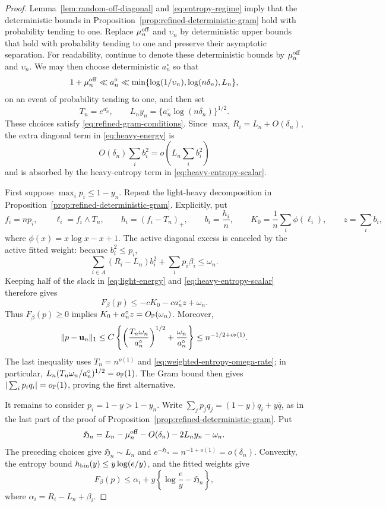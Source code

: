 \begin{proof}
Lemma~\ref{lem:random-off-diagonal} and \eqref{eq:entropy-regime} imply that
the deterministic bounds in Proposition~\ref{prop:refined-deterministic-gram}
hold with probability tending to one. Replace
\(\mu_n^{\rm off}\) and \(\upsilon_n\) by deterministic upper bounds that
hold with probability tending to one and preserve their asymptotic
separation. For readability, continue to denote these deterministic bounds by
\(\mu_n^{\rm off}\) and \(\upsilon_n\). We may then choose
deterministic \(a_n^\circ\) so that
\[
 1+\mu_n^{\rm off}\ll a_n^\circ\ll
 \min\{\log(1/\upsilon_n),\log(n\delta_n),L_n\},
\]
on an event of probability tending to one, and then set
\[
 T_n=e^{a_n^\circ},
 \qquad
 L_ny_n=\{a_n^\circ\log(n\delta_n)\}^{1/2}.
\]
These choices satisfy \eqref{eq:refined-gram-conditions}. Since
\(\max_iR_i=L_n+O(\delta_n)\), the extra diagonal term in
\eqref{eq:heavy-energy} is
\[
 O(\delta_n)\sum_i b_i^2
 =o\left(L_n\sum_i b_i^2\right)
\]
and is absorbed by the heavy-entropy term in
\eqref{eq:heavy-entropy-scalar}.

First suppose \(\max_i p_i\le1-y_n\).  Repeat the light-heavy
decomposition in Proposition~\ref{prop:refined-deterministic-gram}. Explicitly,
put
\[
 f_i=np_i,\qquad \ell_i=f_i\wedge T_n,\qquad h_i=(f_i-T_n)_+,
 \qquad b_i=\frac{h_i}{n},
 \qquad K_0=\frac1n\sum_i\phi(\ell_i),\qquad
 z=\sum_i b_i,
\]
where \(\phi(x)=x\log x-x+1\).
The active diagonal excess is canceled by the active fitted weight:
because \(b_i^2\le p_i\),
\[
 \sum_{i\in A}(R_i-L_n)b_i^2+\sum_i p_i\beta_i
 \le\omega_n.
\]
Keeping half of the slack in \eqref{eq:light-energy} and
\eqref{eq:heavy-entropy-scalar} therefore gives
\begin{equation}
\label{eq:weighted-diffuse-slack}
 F_\beta(p)
 \le
 -cK_0-ca_n^\circ z+\omega_n.
\end{equation}
Thus \(F_\beta(p)\ge0\) implies
\(K_0+a_n^\circ z=O_{\mathbb P}(\omega_n)\).  Moreover,
\[
 \|p-\mathbf u_n\|_1
 \le
 C\left\{
   \left(\frac{T_n\omega_n}{a_n^\circ}\right)^{1/2}
   +\frac{\omega_n}{a_n^\circ}
 \right\}
 \le n^{-1/2+o_{\mathbb P}(1)}.
\]
The last inequality uses \(T_n=n^{o(1)}\) and
\eqref{eq:weighted-entropy-omega-rate}; in particular,
\(L_n(T_n\omega_n/a_n^\circ)^{1/2}=o_{\mathbb P}(1)\).
The Gram bound then gives
\(|\sum_i p_iq_i|=o_{\mathbb P}(1)\), proving the first alternative.

It remains to consider \(p_i=1-y>1-y_n\).  Write
\(\sum_jp_jq_j=(1-y)q_i+y\bar q\), as in the last part of the proof of
Proposition~\ref{prop:refined-deterministic-gram}.  Put
\[
 \mathfrak H_n
 =
 L_n-\mu_n^{\rm off}-O(\delta_n)-2L_ny_n-\omega_n.
\]
The preceding choices give
\(\mathfrak H_n\sim L_n\) and
\(e^{-\mathfrak H_n}=n^{-1+o(1)}=o(\delta_n)\). Convexity,
the entropy bound \(h_{\rm bin}(y)\le y\log(e/y)\), and the fitted weights give
\begin{equation}
\label{eq:weighted-near-vertex}
 F_\beta(p)
 \le
 \alpha_i
 +y\left\{\log\frac ey-\mathfrak H_n\right\},
\end{equation}
where \(\alpha_i=R_i-L_n+\beta_i\).


\end{proof}
